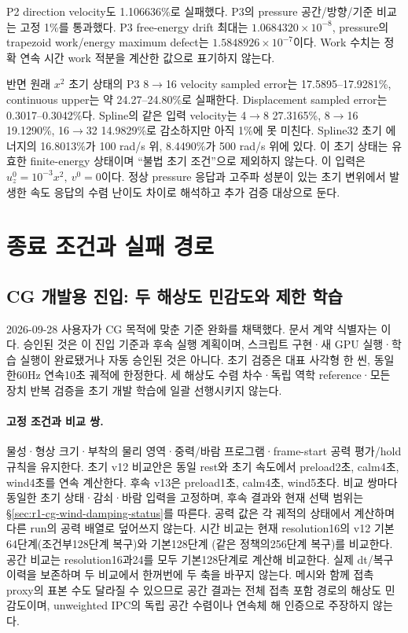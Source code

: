 \documentclass[10pt]{article}
\begin{document}
P2 direction velocity도 1.106636\%로 실패했다. P3의 pressure 공간/방향/기준 비교는 고정 1\%를
통과했다. P3 free-energy drift 최대는 \(1.0684320\times10^{-8}\), pressure의 trapezoid
work/energy maximum defect는 \(1.5848926\times10^{-7}\)이다.
Work 수치는 정확 연속 시간 work 적분을 계산한 값으로 표기하지 않는다.

반면 원래 \(x^2\) 초기 상태의 P3 8$\to$16 velocity sampled error는
17.5895--17.9281\%, continuous upper는 약 24.27--24.80\%로 실패한다.
Displacement sampled error는 0.3017--0.3042\%다.
Spline의 같은 입력 velocity는 4$\to$8 27.3165\%, 8$\to$16 19.1290\%,
16$\to$32 14.9829\%로 감소하지만 아직 1\%에 못 미친다.
Spline32 초기 에너지의 16.8013\%가 100 rad/s 위, 8.4490\%가 500 rad/s 위에 있다.
이 초기 상태는 유효한 finite-energy 상태이며 ``불법 초기 조건''으로 제외하지 않는다.
이 입력은 \(u_z^0=10^{-3}x^2,\ v^0=0\)이다. 정상 pressure 응답과 고주파 성분이 있는 초기 변위에서
발생한 속도 응답의 수렴 난이도 차이로 해석하고 추가 검증 대상으로 둔다.

\section{종료 조건과 실패 경로}
\label{sec:r1-chapter-8}
\label{sec:r1-exit}

\subsection{CG 개발용 진입: 두 해상도 민감도와 제한 학습}
\label{sec:r1-cg-development-entry}
2026-09-28 사용자가 CG 목적에 맞춘 기준 완화를 채택했다. 문서 계약 식별자는
이다. 승인된 것은 이 진입 기준과 후속 실행 계획이며,
스크립트 구현·새 GPU 실행·학습 실행이 완료됐거나 자동 승인된 것은 아니다.
초기 검증은 대표 사각형 한 씬, 동일한60Hz 연속10초 궤적에 한정한다.
세 해상도 수렴 차수·독립 역학 reference·모든 장치 반복 검증을 초기 개발 학습에 일괄 선행시키지 않는다.

\paragraph{고정 조건과 비교 쌍.}
물성·형상 크기·부착의 물리 영역·중력/바람 프로그램·frame-start 공력 평가/hold 규칙을 유지한다.
초기 v12 비교안은 동일 rest와 초기 속도에서 preload2초, calm4초, wind4초를 연속 계산한다.
후속 v13은 preload1초, calm4초, wind5초다. 비교 쌍마다 동일한 초기 상태·감쇠·바람 입력을
고정하며, 후속 결과와 현재 선택 범위는 \S\ref{sec:r1-cg-wind-damping-status}를 따른다.
공력 값은 각 궤적의 상태에서 계산하며 다른 run의 공력 배열로 덮어쓰지 않는다.
시간 비교는 현재 resolution16의 v12 기본64단계(조건부128단계 복구)와 기본128단계
(같은 정책의256단계 복구)를 비교한다. 공간 비교는 resolution16과24를 모두 기본128단계로
계산해 비교한다. 실제 dt/복구 이력을 보존하며 두 비교에서 한꺼번에 두 축을 바꾸지 않는다.
메시와 함께 접촉 proxy의 표본 수도 달라질 수 있으므로 공간 결과는 전체 접촉 포함 경로의
해상도 민감도이며, unweighted IPC의 독립 공간 수렴이나 연속체 해 인증으로 주장하지 않는다.
\end{document}

